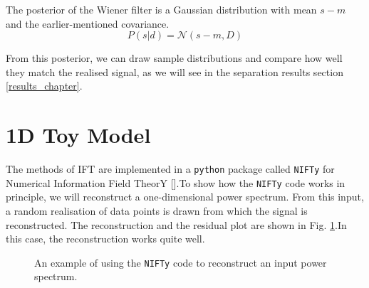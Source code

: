 The posterior of the Wiener filter is a Gaussian distribution with mean $s-m$ and the earlier-mentioned covariance.
\begin{equation}
    P(s|d)=\mathcal{N}(s-m, D)
\end{equation}

From this posterior, we can draw sample distributions and compare how well they match the realised signal, as we will see in the separation results section \ref{results_chapter}.

\section{1D Toy Model}
The methods of IFT are implemented in a {\tt python} package called {\tt NIFTy} for Numerical Information Field TheorY [\cite{selig_nifty_2013}].To show how the {\tt NIFTy} code works in principle, we will reconstruct a one-dimensional power spectrum. From this input, a random realisation of data points is drawn from which the signal is reconstructed. The reconstruction and the residual plot are shown in Fig. \ref{1D_reconstruction}.In this case, the reconstruction works quite well. 

\begin{figure}[h]
    \centering
    \caption{An example of using the {\tt NIFTy} code to reconstruct an input power spectrum.}
    \label{1D_reconstruction}
\end{figure}

